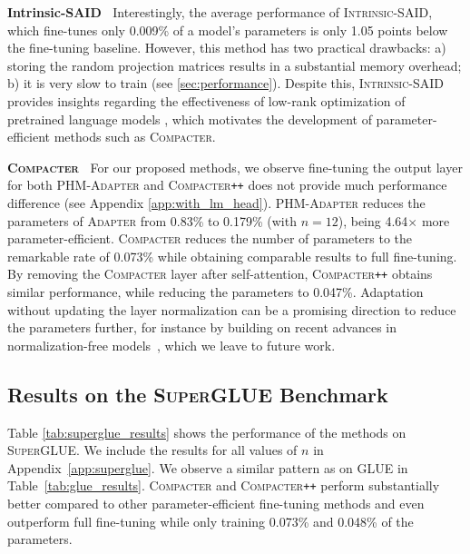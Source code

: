 \documentclass{article}
\newcommand{\adapter}{\textsc{Adapter}\xspace}
\newcommand{\adapternoclf}{\textsc{Adapter}\xspace}
\newcommand{\compacter}{\textsc{Compacter}\xspace}
\newcommand{\compacteronlyff}{\textsc{Compacter}\texttt{++}\xspace} %
\newcommand{\phmadapter}{\textsc{PHM-Adapter}\xspace}
\newcommand{\intrinsic}{\textsc{Intrinsic-SAID}\xspace}
\newcommand{\glue}{\textsc{GLUE}\xspace}
\newcommand{\superglue}{\textsc{SuperGLUE}\xspace}
\begin{document}
\noindent \textbf{Intrinsic-SAID} $\:$ Interestingly, the average performance of \intrinsic, which fine-tunes only 0.009\% of a model's parameters is only 1.05 points below the fine-tuning baseline. However, this method has two practical drawbacks: a) storing the random projection matrices results in a substantial memory overhead;  b) it is very slow to train (see \textsection \ref{sec:performance}). Despite this, \intrinsic provides insights regarding the effectiveness of low-rank optimization of pretrained language models \citep{aghajanyan2020intrinsic}, which motivates the development of parameter-efficient methods such as \compacter.


\noindent \textbf{\compacter} $\:$ For our proposed methods, we observe fine-tuning the output layer for both \phmadapter and \compacteronlyff does not provide much performance difference (see Appendix \ref{app:with_lm_head}). \phmadapter reduces the parameters of \adapternoclf from 0.83\% to 0.179\% (with $n=12$), being 4.64$\times$ more parameter-efficient. 
\compacter reduces the number of parameters to the remarkable rate of 0.073\% while obtaining comparable results to full fine-tuning. By removing the \compacter layer after self-attention, \compacteronlyff obtains similar performance, while reducing the parameters to 0.047\%. Adaptation without updating the layer normalization can be a promising direction to reduce the parameters further, for instance by building on recent advances in normalization-free models~\citep{brock2021high}, which we leave to future work. 


\subsection{Results on the \superglue Benchmark} 
Table \ref{tab:superglue_results} shows the performance of the methods on \superglue \citep{wang2019superglue}. We include the results for all values of $n$ in Appendix~\ref{app:superglue}.  We observe a similar pattern as on \glue in Table~\ref{tab:glue_results}. \compacter and \compacteronlyff perform substantially better compared to other parameter-efficient fine-tuning methods and even outperform full fine-tuning while only training 0.073\% and 0.048\% of the parameters.
\end{document}
